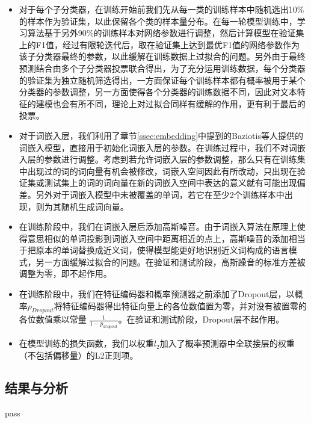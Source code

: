\begin{itemize}

\item 对于每个子分类器，在训练开始前我们先从每一类的训练样本中随机选出10\%的样本作为验证集，以此保留各个类的样本量分布。在每一轮模型训练中，学习算法基于另外90\%的训练样本对网络参数进行调整，然后计算模型在验证集上的F1值，经过有限轮迭代后，取在验证集上达到最优F1值的网络参数作为该子分类器最终的参数，以此缓解在训练数据上过拟合的问题。另外由于最终预测结合由多个子分类器投票联合得出，为了充分运用训练数据，每个分类器的验证集为独立随机筛选得出，一方面保证每个训练样本都有概率被用于某个分类器的参数调整，另一方面使得各个分类器的训练数据不同，因此对文本特征的建模也会有所不同，理论上对过拟合同样有缓解的作用，更有利于最后的投票。

\item 对于词嵌入层，我们利用了章节\ref{ssec:embedding}中提到的Baziotis等人\cite{baziotis2018ntua}提供的词嵌入模型，直接用于初始化词嵌入层的参数。在训练过程中，我们不对词嵌入层的参数进行调整。考虑到若允许词嵌入层的参数调整，那么只有在训练集中出现过的词的词向量有机会被修改，词嵌入空间因此有所改动，只出现在验证集或测试集上的词的词向量在新的词嵌入空间中表达的意义就有可能出现偏差。另外对于词嵌入模型中未被覆盖的单词，若它在至少2个训练样本中出现，则为其随机生成词向量。

\item 在训练阶段中，我们在词嵌入层后添加高斯噪音。由于词嵌入算法在原理上使得意思相似的单词投影到词嵌入空间中距离相近的点上，高斯噪音的添加相当于把原本的单词替换成近义词，使得模型能更好地识别近义词构成的语言模式，另一方面缓解过拟合的问题。在验证和测试阶段，高斯躁音的标准方差被调整为零，即不起作用。

\item 在训练阶段中，我们在特征编码器和概率预测器之前添加了Dropout层，以概率$p_{Dropout}$将特征编码器得出特征向量上的各位数值置为零，并对没有被置零的各位数值乘以常量 $\frac{1}{1-p_{dropout}}$。在验证和测试阶段，Dropout层不起作用。

\item 在模型训练的损失函数，我们以权重$l_2$加入了概率预测器中全联接层的权重（不包括偏移量）的L2正则项。

\end{itemize}

\subsection{结果与分析}

pass

